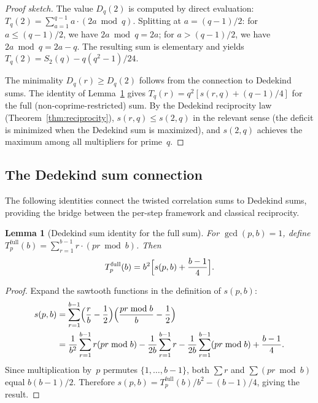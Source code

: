 \documentclass[11pt]{article}
\newtheorem{lemma}[theorem]{Lemma}
\theoremstyle{definition}
\begin{document}
\begin{proof}[Proof sketch]
The value $D_q(2)$ is computed by direct evaluation:
$T_q(2) = \sum_{a=1}^{q-1} a \cdot (2a \bmod q)$.  Splitting at
$a = (q-1)/2$: for $a \le (q-1)/2$, we have $2a \bmod q = 2a$;
for $a > (q-1)/2$, we have $2a \bmod q = 2a - q$.  The resulting
sum is elementary and yields $T_q(2) = S_2(q) - q(q^2-1)/24$.

The minimality $D_q(r) \ge D_q(2)$ follows from the connection to
Dedekind sums.  The identity of Lemma~\ref{lem:dedekind-identity}
gives $T_q(r) = q^2[s(r,q) + (q-1)/4]$ for the full (non-coprime-restricted)
sum.  By the Dedekind reciprocity law (Theorem~\ref{thm:reciprocity}),
$s(r,q) \le s(2,q)$ in the relevant sense (the deficit is minimized
when the Dedekind sum is maximized), and $s(2,q)$ achieves the
maximum among all multipliers for prime~$q$.
\end{proof}

\subsection{The Dedekind sum connection}\label{sec:dedekind}

The following identities connect the twisted correlation sums to
Dedekind sums, providing the bridge between the per-step framework
and classical reciprocity.

\begin{lemma}[Dedekind sum identity for the full sum]\label{lem:dedekind-identity}
For $\gcd(p,b) = 1$, define
$T_p^{\mathrm{full}}(b) = \sum_{r=1}^{b-1} r \cdot (pr \bmod b)$.
Then
\begin{equation}\label{eq:dedekind-full}
  T_p^{\mathrm{full}}(b) = b^2\Bigl[s(p,b) + \frac{b-1}{4}\Bigr].
\end{equation}
\end{lemma}

\begin{proof}
Expand the sawtooth functions in the definition of $s(p,b)$:
\begin{align*}
  s(p,b) &= \sum_{r=1}^{b-1}
    \Bigl(\frac{r}{b} - \frac{1}{2}\Bigr)
    \Bigl(\frac{pr \bmod b}{b} - \frac{1}{2}\Bigr) \\
  &= \frac{1}{b^2}\sum_{r=1}^{b-1} r(pr \bmod b)
    - \frac{1}{2b}\sum_{r=1}^{b-1} r
    - \frac{1}{2b}\sum_{r=1}^{b-1} (pr \bmod b)
    + \frac{b-1}{4}.
\end{align*}
Since multiplication by~$p$ permutes $\{1, \ldots, b-1\}$,
both $\sum r$ and $\sum (pr \bmod b)$ equal $b(b-1)/2$.
Therefore $s(p,b) = T_p^{\mathrm{full}}(b)/b^2 - (b-1)/4$,
giving the result.
\end{proof}
\end{document}
